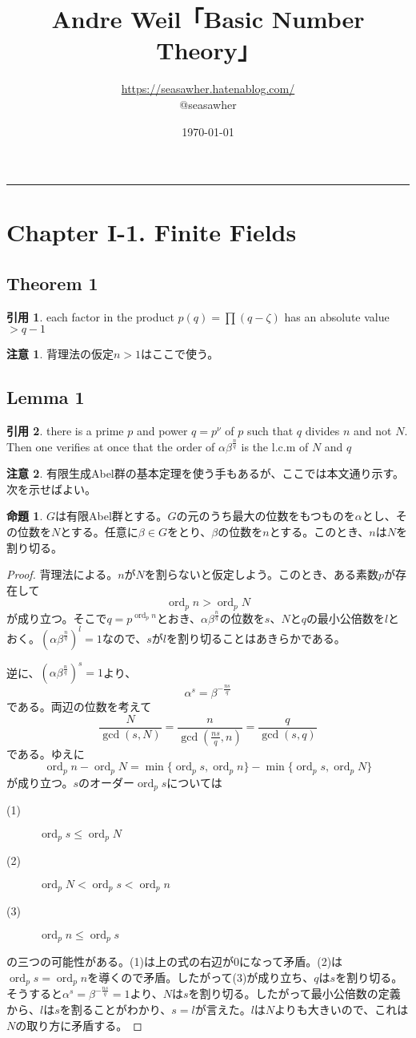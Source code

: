 \documentclass[12pt]{jsarticle}%
\makeatletter
\renewcommand{\maketitle}{\begin{titlepage}%
    \let\footnotesize\small
    \let\footnoterule\relax
    \parindent \z@
    \reset@font
    \null\vfil
    \begin{flushleft}
      \huge \@title
    \end{flushleft}
    \par
    \hrule height 4pt
    \par
    \begin{flushright}
      \LARGE \@author \par
    \end{flushright}
    \vskip 60\p@
    \vfil\null
    \begin{flushright}
        {\small \@date}%
    \end{flushright}
  \end{titlepage}%
  \setcounter{footnote}{0}%
}
\renewenvironment{leftbar}{%
  \renewcommand\FrameCommand{\vrule width 1pt \hspace{10pt}}%
  \MakeFramed {\advance\hsize-\width \FrameRestore}}%
 {\endMakeFramed}
\newcommand{\barquo}[1]{\begin{leftbar} \begin{quo} #1 \end{quo} \end{leftbar}}%
\newcommand{\bfsubsection}[1]{\subsection*{\textbf{#1}}}
\newcommand{\bfsection}[1]{\section*{\textbf{#1}}}
\theoremstyle{definition}%
\newtheorem*{proposition}{命題}
\newcommand{\prop}[1]{\begin{oframed} \begin{proposition} #1 \end{proposition} \end{oframed}}%
\newtheorem*{rem}{注意}
\newtheorem*{quo}{引用}
\DeclareMathOperator{\ord}{ord}
\makeatother
\begin{document}
\title{Andre Weil「Basic Number Theory」}
\author{\url{https://seasawher.hatenablog.com/} \\ @seasawher}
\date{\today}
\maketitle




\bfsection{Chapter I-1. Finite Fields}

\bfsubsection{Theorem 1}
\barquo{
each factor in the product $p(q) = \prod (q - \zeta)$ has an absolute value $> q-1$
}
\begin{rem}
  背理法の仮定$n > 1$はここで使う。
\end{rem}




\bfsubsection{Lemma 1}
\barquo{
there is a prime $p$ and power $q = p^{\nu}$ of $p$ such that $q$ divides $n$ and not $N$. Then one verifies at once that the order of $\alpha \beta^{\frac{n}{q}}$ is the l.c.m of $N$ and $q$
}

\begin{rem}
有限生成Abel群の基本定理を使う手もあるが、ここでは本文通り示す。次を示せばよい。
\end{rem}
\prop{
$G$は有限Abel群とする。$G$の元のうち最大の位数をもつものを$\alpha$とし、その位数を$N$とする。任意に$\beta \in G$をとり、$\beta$の位数を$n$とする。このとき、$n$は$N$を割り切る。
}

\begin{proof}
背理法による。$n$が$N$を割らないと仮定しよう。このとき、ある素数$p$が存在して
\[
\ord_p n > \ord_p N
\]
が成り立つ。そこで$q = p^{\ord_p n}$とおき、$\alpha \beta^{\frac{n}{q}}$の位数を$s$、$N$と$q$の最小公倍数を$l$とおく。$(\alpha \beta^{\frac{n}{q}})^l = 1$なので、$s$が$l$を割り切ることはあきらかである。

逆に、$(\alpha \beta^{\frac{n}{q}})^s=1$より、
\[
\alpha^s = \beta^{-\frac{ns}{q} }
\]
である。両辺の位数を考えて
\[
\frac{N}{\gcd(s,N)} = \frac{n}{\gcd(\frac{ns}{q},n)} = \frac{q}{\gcd(s,q)}
\]
である。ゆえに
\[
\ord_p n - \ord_p N = \min\{ \ord_p s , \ord_p n\} - \min\{ \ord_p s, \ord_p N\}
\]
が成り立つ。$s$のオーダー$\ord_p s$については
\begin{description}
  \item[(1)]$\ord_p s \leq \ord_p N$
  \item[(2)]$\ord_p N < \ord_p s < \ord_p n$
  \item[(3)]$\ord_p n \leq \ord_p s$
\end{description}
の三つの可能性がある。(1)は上の式の右辺が0になって矛盾。(2)は$\ord_p s = \ord_p n$を導くので矛盾。したがって(3)が成り立ち、$q$は$s$を割り切る。そうすると$\alpha^s = \beta^{-\frac{ns}{q} }=1$より、$N$は$s$を割り切る。したがって最小公倍数の定義から、$l$は$s$を割ることがわかり、$s = l$が言えた。$l$は$N$よりも大きいので、これは$N$の取り方に矛盾する。
\end{proof}
\end{document}
